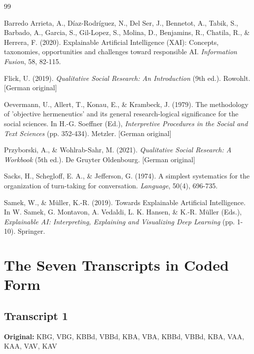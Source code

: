 \documentclass[
  12pt,
  a4paper,
  oneside,
  titlepage
]{article}
\begin{document}
\newpage
\begin{thebibliography}{99}

Barredo Arrieta, A., Díaz-Rodríguez, N., Del Ser, J., Bennetot, A., Tabik, S., 
Barbado, A., Garcia, S., Gil-Lopez, S., Molina, D., Benjamins, R., Chatila, R., 
\& Herrera, F. (2020). Explainable Artificial Intelligence (XAI): Concepts, 
taxonomies, opportunities and challenges toward responsible AI. 
\textit{Information Fusion}, 58, 82-115.

Flick, U. (2019). \textit{Qualitative Social Research: An Introduction} (9th ed.). 
Rowohlt. [German original]

Oevermann, U., Allert, T., Konau, E., \& Krambeck, J. (1979). The methodology 
of 'objective hermeneutics' and its general research-logical significance for 
the social sciences. In H.-G. Soeffner (Ed.), \textit{Interpretive Procedures 
in the Social and Text Sciences} (pp. 352-434). Metzler. [German original]

Przyborski, A., \& Wohlrab-Sahr, M. (2021). \textit{Qualitative Social Research: 
A Workbook} (5th ed.). De Gruyter Oldenbourg. [German original]

Sacks, H., Schegloff, E. A., \& Jefferson, G. (1974). A simplest systematics for 
the organization of turn-taking for conversation. \textit{Language}, 50(4), 696-735.

Samek, W., \& Müller, K.-R. (2019). Towards Explainable Artificial Intelligence. 
In W. Samek, G. Montavon, A. Vedaldi, L. K. Hansen, \& K.-R. Müller (Eds.), 
\textit{Explainable AI: Interpreting, Explaining and Visualizing Deep Learning} 
(pp. 1-10). Springer.

\end{thebibliography}

\newpage
\appendix
\section{The Seven Transcripts in Coded Form}

\subsection{Transcript 1}
\textbf{Original:} KBG, VBG, KBBd, VBBd, KBA, VBA, KBBd, VBBd, KBA, VAA, KAA, VAV, KAV
\end{document}
